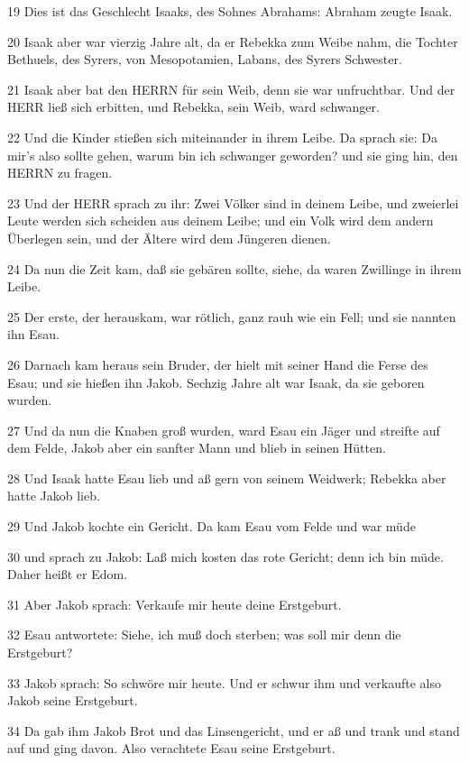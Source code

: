 \par 19 Dies ist das Geschlecht Isaaks, des Sohnes Abrahams: Abraham zeugte Isaak.
\par 20 Isaak aber war vierzig Jahre alt, da er Rebekka zum Weibe nahm, die Tochter Bethuels, des Syrers, von Mesopotamien, Labans, des Syrers Schwester.
\par 21 Isaak aber bat den HERRN für sein Weib, denn sie war unfruchtbar. Und der HERR ließ sich erbitten, und Rebekka, sein Weib, ward schwanger.
\par 22 Und die Kinder stießen sich miteinander in ihrem Leibe. Da sprach sie: Da mir's also sollte gehen, warum bin ich schwanger geworden? und sie ging hin, den HERRN zu fragen.
\par 23 Und der HERR sprach zu ihr: Zwei Völker sind in deinem Leibe, und zweierlei Leute werden sich scheiden aus deinem Leibe; und ein Volk wird dem andern Überlegen sein, und der Ältere wird dem Jüngeren dienen.
\par 24 Da nun die Zeit kam, daß sie gebären sollte, siehe, da waren Zwillinge in ihrem Leibe.
\par 25 Der erste, der herauskam, war rötlich, ganz rauh wie ein Fell; und sie nannten ihn Esau.
\par 26 Darnach kam heraus sein Bruder, der hielt mit seiner Hand die Ferse des Esau; und sie hießen ihn Jakob. Sechzig Jahre alt war Isaak, da sie geboren wurden.
\par 27 Und da nun die Knaben groß wurden, ward Esau ein Jäger und streifte auf dem Felde, Jakob aber ein sanfter Mann und blieb in seinen Hütten.
\par 28 Und Isaak hatte Esau lieb und aß gern von seinem Weidwerk; Rebekka aber hatte Jakob lieb.
\par 29 Und Jakob kochte ein Gericht. Da kam Esau vom Felde und war müde
\par 30 und sprach zu Jakob: Laß mich kosten das rote Gericht; denn ich bin müde. Daher heißt er Edom.
\par 31 Aber Jakob sprach: Verkaufe mir heute deine Erstgeburt.
\par 32 Esau antwortete: Siehe, ich muß doch sterben; was soll mir denn die Erstgeburt?
\par 33 Jakob sprach: So schwöre mir heute. Und er schwur ihm und verkaufte also Jakob seine Erstgeburt.
\par 34 Da gab ihm Jakob Brot und das Linsengericht, und er aß und trank und stand auf und ging davon. Also verachtete Esau seine Erstgeburt.

